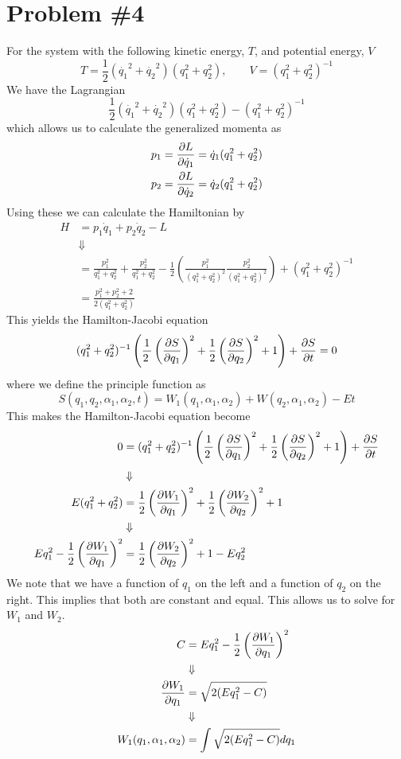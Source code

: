 \documentclass[11pt]{article}
\numberwithin{equation}{section}
\begin{document}
\section{Problem \#4}
For the system with the following kinetic energy, $T$, and potential energy, $V$
$$T= \frac{1}{2}(\dot{q_1}^2+\dot{q_2}^2)(q_1^2+q_2^2),\qquad V = (q_1^2+q_2^2)^{-1}$$
We have the Lagrangian
$$\frac{1}{2}(\dot{q_1}^2+\dot{q_2}^2)(q_1^2+q_2^2) - (q_1^2+q_2^2)^{-1}$$
which allows us to calculate the generalized momenta as
\begin{align*}
p_1 = \frac{\partial{L}}{\partial{\dot{q}_1}} &= \dot{q}_1(q_1^2+q_2^2)\\
p_2 = \frac{\partial{L}}{\partial{\dot{q}_2}} &= \dot{q}_2(q_1^2+q_2^2)
\end{align*}
Using these we can calculate the Hamiltonian by
\begin{align*}
H &= p_1\dot{q}_1 + p_2\dot{q}_2 - L\\
&\Downarrow\\
&= \frac{p_1^2}{q_1^2+q_2^2} + \frac{p_2^2}{q_1^2+q_2^2} - \frac{1}{2}\left(\frac{p_1^2}{(q_1^2+q_2^2)^2}\frac{p_2^2}{(q_1^2+q_2^2)^2}\right) + (q_1^2+q_2^2)^{-1}\\
&= \frac{p_1^2+p_2^2+2}{2(q_1^2+q_2^2)} 
\end{align*}
This yields the Hamilton-Jacobi equation 
$$(q_1^2+q_2^2)^{-1}\left(\frac{1}{2\dfrac{}{}}\left(\frac{\partial{S}}{\partial{q_1}}\right)^2 + \frac{1}{2}\left(\frac{\partial{S}}{\partial{q_2}}\right)^2 + 1\right) + \frac{\partial{S}}{\partial{t}} = 0$$
where we define the principle function as
$$S(q_1,q_2,\alpha_1,\alpha_2,t) = W_1(q_1,\alpha_1,\alpha_2) + W(q_2,\alpha_1,\alpha_2) - Et$$
This makes the Hamilton-Jacobi equation become
\begin{align*}
0 &= (q_1^2+q_2^2)^{-1}\left(\frac{1}{2\dfrac{}{}}\left(\frac{\partial{S}}{\partial{q_1}}\right)^2 + \frac{1}{2}\left(\frac{\partial{S}}{\partial{q_2}}\right)^2 + 1\right) + \frac{\partial{S}}{\partial{t}}\\
&\Downarrow\\
E(q_1^2+q_2^2) &= \frac{1}{2}\left(\frac{\partial{W_1}}{\partial{q_1}}\right)^2 + \frac{1}{2}\left(\frac{\partial{W_2}}{\partial{q_2}}\right)^2 + 1\\
&\Downarrow\\
Eq_1^2 - \frac{1}{2}\left(\frac{\partial{W_1}}{\partial{q_1}}\right)^2 &= \frac{1}{2}\left(\frac{\partial{W_2}}{\partial{q_2}}\right)^2 + 1 - Eq_2^2
\end{align*}
We note that we have a function of $q_1$ on the left and a function of $q_2$ on the right. 
This implies that both are constant and equal. This allows us to solve for $W_1$ and $W_2$.
\begin{align*}
C &= Eq_1^2 - \frac{1}{2}\left(\frac{\partial{W_1}}{\partial{q_1}}\right)^2\\
&\Downarrow\\
\frac{\partial{W_1}}{\partial{q_1}} &= \sqrt{2(Eq_1^2 - C)}\\
&\Downarrow\\
W_1(q_1,\alpha_1,\alpha_2) &= \int\sqrt{2(Eq_1^2 - C)}dq_1
\end{align*}
\end{document}
